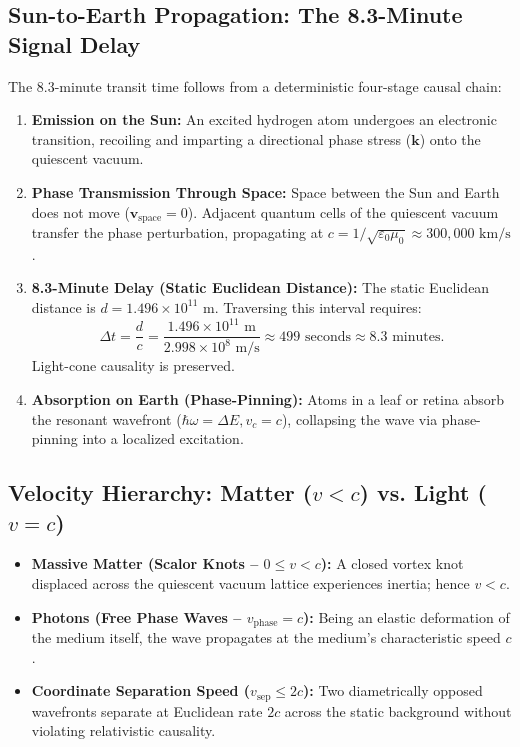 \subsection{Sun-to-Earth Propagation: The 8.3-Minute Signal Delay}
\label{sec:kavramsal_netlik_main}

The 8.3-minute transit time follows from a deterministic four-stage causal chain:
\begin{enumerate}
    \item \textbf{Emission on the Sun:} An excited hydrogen atom undergoes an electronic transition, recoiling and imparting a directional phase stress ($\mathbf{k}$) onto the quiescent vacuum.
    \item \textbf{Phase Transmission Through Space:} Space between the Sun and Earth does not move ($\mathbf{v}_{\mathrm{space}} = 0$). Adjacent quantum cells of the quiescent vacuum transfer the phase perturbation, propagating at $c = 1/\sqrt{\varepsilon_0\mu_0} \approx 300{,}000\text{ km/s}$.
    \item \textbf{8.3-Minute Delay (Static Euclidean Distance):} The static Euclidean distance is $d = 1.496 \times 10^{11}\text{ m}$. Traversing this interval requires:
          \begin{equation}
              \Delta t = \frac{d}{c} = \frac{1.496 \times 10^{11}\text{ m}}{2.998 \times 10^8\text{ m/s}} \approx 499\text{ seconds} \approx 8.3\text{ minutes}.
          \end{equation}
          Light-cone causality is preserved.
    \item \textbf{Absorption on Earth (Phase-Pinning):} Atoms in a leaf or retina absorb the resonant wavefront ($\hbar\omega = \Delta E, v_c = c$), collapsing the wave via phase-pinning into a localized excitation.
\end{enumerate}

\subsection{Velocity Hierarchy: Matter ($v < c$) vs. Light ($v = c$)}
\label{sec:hiz_hiyerarsisi_cozum}

\begin{itemize}
    \item \textbf{Massive Matter (Scalor Knots -- $0 \le v < c$):} A closed vortex knot displaced across the quiescent vacuum lattice experiences inertia; hence $v < c$.
    \item \textbf{Photons (Free Phase Waves -- $v_{\mathrm{phase}} = c$):} Being an elastic deformation of the medium itself, the wave propagates at the medium's characteristic speed $c$.
    \item \textbf{Coordinate Separation Speed ($v_{\mathrm{sep}} \le 2c$):} Two diametrically opposed wavefronts separate at Euclidean rate $2c$ across the static background without violating relativistic causality.
\end{itemize}


